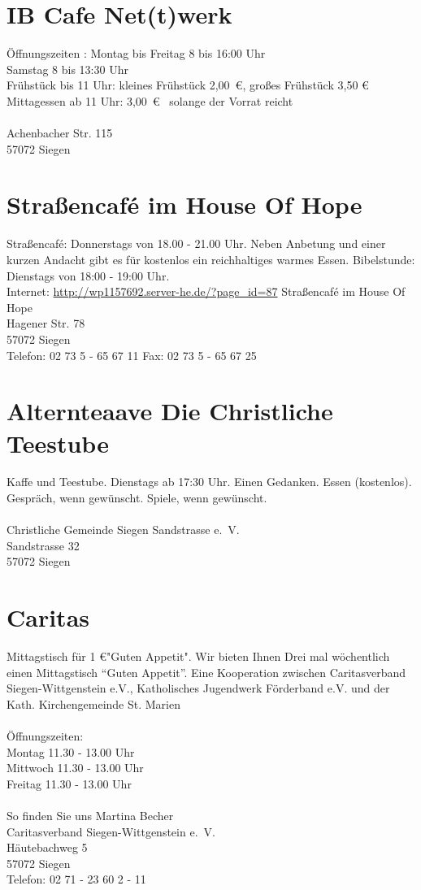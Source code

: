 \section{IB Cafe Net(t)werk}
Öffnungszeiten : Montag bis Freitag 8 bis 16:00 Uhr\\
Samstag 8 bis 13:30 Uhr \\
Frühstück bis 11 Uhr: kleines Frühstück 2,00~\euro, großes Frühstück 3,50 \euro \\
Mittagessen ab 11 Uhr: 3,00~\euro~ solange der Vorrat reicht \\
\\
Achenbacher Str. 115 \\
57072 Siegen

\section{Straßencafé im House Of Hope}
Straßencafé: Donnerstags von 18.00 - 21.00 Uhr. Neben Anbetung und einer kurzen Andacht gibt es für kostenlos ein reichhaltiges warmes Essen. Bibelstunde: Dienstags von 18:00 - 19:00 Uhr.\\
Internet: \href{http://wp1157692.server-he.de/?page_id=87}{http://wp1157692.server-he.de/?page\_id=87} 
Straßencafé im House Of Hope\\
Hagener Str. 78\\
57072 Siegen\\
Telefon: 02 73 5 - 65 67 11 
Fax: 02 73 5 - 65 67 25

\section{Alternteaave Die Christliche Teestube}
Kaffe und Teestube. Dienstags ab 17:30 Uhr. Einen Gedanken. Essen (kostenlos). Gespräch, wenn gewünscht. Spiele, wenn gewünscht.\\
\\
Christliche Gemeinde Siegen Sandstrasse e.~V.\\
Sandstrasse 32\\
57072 Siegen

\section{Caritas}
Mittagstisch für 1 \euro  "Guten Appetit". Wir bieten Ihnen Drei mal wöchentlich einen Mittagstisch \enquote{Guten Appetit}. Eine Kooperation zwischen Caritasverband Siegen-Wittgenstein e.V., Katholisches Jugendwerk Förderband e.V. und der Kath. Kirchengemeinde St. Marien\\  
\\
Öffnungszeiten:\\
Montag 11.30 - 13.00 Uhr \\
Mittwoch 11.30 - 13.00 Uhr \\
Freitag 11.30 - 13.00 Uhr \\
\\
So finden Sie uns 
Martina Becher\\
Caritasverband Siegen-Wittgenstein e.~V.\\ 
Häutebachweg 5\\
57072 Siegen \\
Telefon: 02 71 - 23 60 2 - 11 

